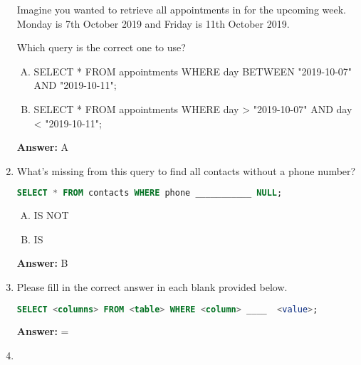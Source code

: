 \documentclass[12pt]{article}
\begin{document}
\begin{enumerate}[1.]
    Imagine you wanted to retrieve all appointments in for the upcoming week. Monday
    is 7th October 2019 and Friday is 11th October 2019.

    \bigskip

    Which query is the correct one to use?

    \bigskip

    \begin{enumerate}[A.]
        \item SELECT * FROM appointments WHERE day BETWEEN "2019-10-07" AND "2019-10-11";
        \item SELECT * FROM appointments WHERE day > "2019-10-07" AND day < "2019-10-11";
    \end{enumerate}

    \bigskip

    \textbf{Answer:} A

    \item

    What's missing from this query to find all contacts without a phone number?

    \bigskip

    \begin{lstlisting}[language=SQL]
    SELECT * FROM contacts WHERE phone ___________ NULL;
    \end{lstlisting}

    \bigskip

    \begin{enumerate}[A.]
        \item IS NOT
        \item IS
    \end{enumerate}

    \bigskip

    \textbf{Answer:} B

    \item

    Please fill in the correct answer in each blank provided below.

    \bigskip

    \bigskip

    \begin{lstlisting}[language=SQL]
    SELECT <columns> FROM <table> WHERE <column> ____  <value>;
    \end{lstlisting}

    \bigskip

    \textbf{Answer:} =

    \item


\end{enumerate}
\end{document}
